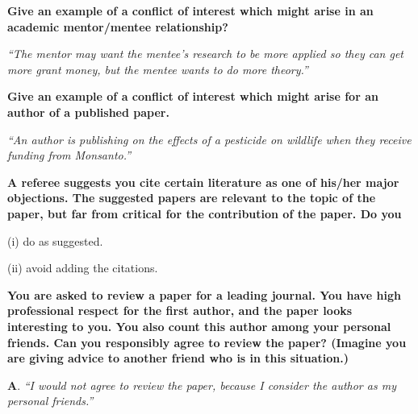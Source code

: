 \documentclass[portrait,11pt]{seminar}
\begin{document}



\es
\bs

{\bf 
Give an example of a conflict of interest which might arise in an academic mentor/mentee relationship?
}

{\it ``The mentor may want the mentee's research to be more applied so they can get more grant money, but the mentee wants to do more theory.''}






\es \bs 
{\bf 
Give an example of a conflict of interest which might arise for an author of a published paper.}


{\it ``An author is publishing on the effects of a pesticide on wildlife when they receive funding from Monsanto.''}




\es
\bs

{\bf 
A referee suggests you cite certain literature as one of his/her major objections. The suggested papers are relevant to the topic of the paper, but far from critical for the contribution of the paper. Do you

(i) do as suggested.

(ii) avoid adding the citations.
}

\es \bs 
{\bf
You are asked to review a paper for a leading journal. You have high professional respect for the first author, and the paper looks interesting to you. You also count this author among your personal friends. Can you responsibly agree to review the paper? (Imagine you are giving advice to another friend who is in this situation.)
}

{\bf A}. {\it ``I would not agree to review the paper, because I consider the author as my personal friends.''}

\medskip
\end{document}
